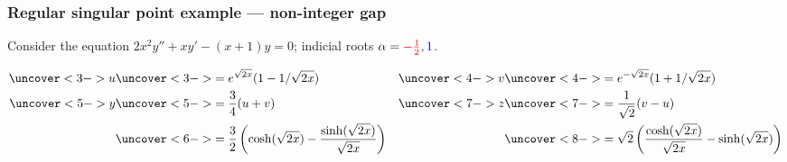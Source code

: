 \documentclass[9pt]{beamer}
\begin{document}
\begin{frame}[t]
 \frametitle{Regular singular point example --- non-integer gap}
 
 Consider the equation
 $2x^2y''+xy'-(x+1)y=0$; indicial roots $\alpha={\color{red}-\tfrac{1}{2}},{\color{blue}1}$.

 \reminderbar

 \begin{center}
 \end{center}

 {\small \begin{align*}
  \uc<3->{u} &\uc<3->{= e^{\sqrt{2x}}(1-1/\sqrt{2x})} & 
  \uc<4->{v} &\uc<4->{= e^{-\sqrt{2x}}(1+1/\sqrt{2x})} \\
  \uc<5->{y} &\uc<5->{= \frac{3}{4}(u+v)} & 
  \uc<7->{z} &\uc<7->{= \frac{1}{\sqrt{2}}(v-u)} \\
   &\uc<6->{=\frac{3}{2}\left(\cosh(\sqrt{2x})-\frac{\sinh(\sqrt{2x})}{\sqrt{2x}}\right)} &
   &\uc<8->{=\sqrt{2}\left(\frac{\cosh(\sqrt{2x})}{\sqrt{2x}}-\sinh(\sqrt{2x})\right)} 
 \end{align*}}
\end{frame}
\end{document}
